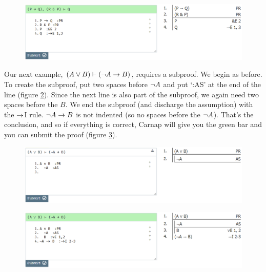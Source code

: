 \begin{figure}[h]
\includegraphics[width=13cm]{textbook--1c.PNG}
\caption{}
\label{fig:proof-1c}
\end{figure}

Our next example, $(A \vee B) \vdash ({\neg} A \rightarrow B)$, requires a subproof. We begin as before. To create the subproof, put two spaces before ${\neg} A$ and put `:AS' at the end of the line (figure \ref{fig:proof-2a}). Since the next line is also part of the subproof, we again need two spaces before the $B$. We end the subproof (and discharge the assumption) with the $\rightarrow$I rule. ${\neg} A \rightarrow B$ is not indented (so no spaces before the ${\neg} A$). That's the conclusion, and so if everything is correct, Carnap will give you the green bar and you can submit the proof (figure \ref{fig:proof-2b}). 

\begin{figure}[h]
\includegraphics[width=13cm]{textbook--2a.PNG}
\caption{}
\label{fig:proof-2a}
\end{figure}

\begin{figure}[h]
\includegraphics[width=13cm]{textbook--2b.PNG}
\caption{}
\label{fig:proof-2b}
\end{figure}

